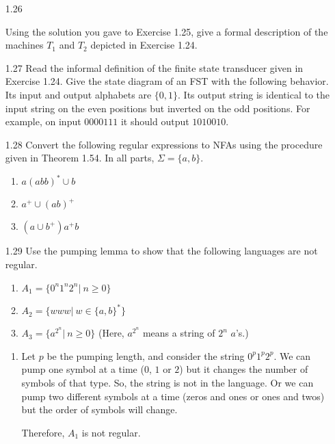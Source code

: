 \begin{enumerate}

    \item [1.26]

        Using the solution you gave to Exercise 1.25, give a formal description of the machines $T_1$ and $T_2$ depicted in Exercise 1.24.

    \item [1.27]
          Read the informal definition of the finite state transducer given in Exercise 1.24. Give the state diagram of an FST with the following behavior. Its input and output alphabets are $\{0,1\}$. Its output string is identical to the input string on the even positions but inverted on the odd positions. For example, on input $0000111$ it should output $1010010$.

    \item [1.28]
          Convert the following regular expressions to NFAs using the procedure given in Theorem 1.54. In all parts, $\Sigma=\{a,b\}$. \begin{enumerate}
              \item $a(abb)^\ast \cup b$
              \item $a^+ \cup (ab)^+$
              \item $(a \cup b^+)a^+b$
          \end{enumerate}
    \item [1.29]
          Use the pumping lemma to show that the following languages are not regular.
          \begin{enumerate}
              \item $A_1 =\{0^n 1^n 2^n | ~n \geq 0\}$
              \item $A_2 =\{www|~w \in \{a,b\}^\ast\}$
              \item $A_3 = \{ a^{2^n} | ~n \geq 0\}$  (Here, $a^{2^n}$ means a string of $2^n$ $a$’s.)
          \end{enumerate}

          \begin{enumerate}
              \item Let $p$ be the pumping length, and consider the string $0^p 1^p 2^p$. We can pump one symbol at a time ($0$, $1$ or $2$) but it changes the number of symbols of that type. So, the string is not in the language. Or we can pump two different symbols at a time (zeros and ones or ones and twos) but the order of symbols will change.

                    Therefore, $A_1$ is not regular.


\end{enumerate}
\end{enumerate}
